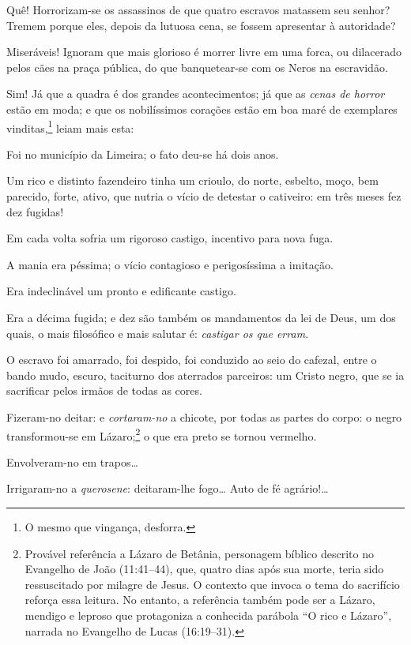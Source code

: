 {Quê! Horrorizam-se os assassinos de que quatro escravos matassem seu
senhor? Tremem porque eles, depois da lutuosa cena, se fossem apresentar
à autoridade?

Miseráveis! Ignoram que mais glorioso é morrer livre em uma forca, ou
dilacerado pelos cães na praça pública, do que banquetear-se com os
Neros na escravidão.

Sim! Já que a quadra é dos grandes acontecimentos; já que as \emph{cenas
de horror} estão em moda; e que os nobilíssimos corações estão em boa
maré de exemplares vinditas,\footnote{O mesmo que vingança, desforra.}
leiam mais esta:

Foi no município da Limeira; o fato deu-se há dois anos.

Um rico e distinto fazendeiro tinha um crioulo, do norte, esbelto, moço,
bem parecido, forte, ativo, que nutria o vício de detestar o cativeiro:
em três meses fez dez fugidas!

Em cada volta sofria um rigoroso castigo, incentivo para nova fuga.

A mania era péssima; o vício contagioso e perigosíssima a imitação.

Era indeclinável um pronto e edificante castigo.

Era a décima fugida; e dez são também os mandamentos da lei de Deus, um
dos quais, o mais filosófico e mais salutar é: \emph{castigar os que
erram.}

O escravo foi amarrado, foi despido, foi conduzido ao seio do cafezal,
entre o bando mudo, escuro, taciturno dos aterrados parceiros: um Cristo negro, que se ia sacrificar pelos irmãos de todas as cores.

Fizeram-no deitar: e \emph{cortaram-no} a chicote, por todas as partes
do corpo: o negro transformou-se em Lázaro;\footnote{Provável
  referência a Lázaro de Betânia, personagem bíblico descrito no
  Evangelho de João (11:41--44), que, quatro dias após sua morte, teria
  sido ressuscitado por milagre de Jesus. O contexto que invoca o tema
  do sacrifício reforça essa leitura. No entanto, a
  referência também pode ser a Lázaro, mendigo e leproso que protagoniza
  a conhecida parábola ``O rico e Lázaro'', narrada no Evangelho de
  Lucas (16:19--31).} o que era preto se tornou vermelho.

Envolveram-no em trapos\ldots{}

Irrigaram-no a \emph{querosene}: deitaram-lhe fogo\ldots{} Auto de fé
agrário!\ldots{}

}
